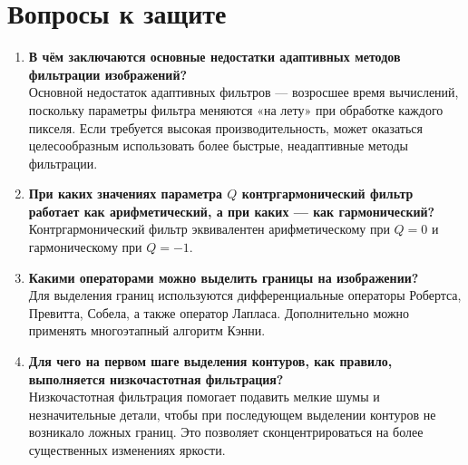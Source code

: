 \documentclass[a4paper,12pt]{article}
\begin{document}
\section{Вопросы к защите}
\begin{enumerate}
    \item \textbf{В чём заключаются основные недостатки адаптивных методов фильтрации изображений?}\\[0.3em]
    Основной недостаток адаптивных фильтров --- возросшее время вычислений, поскольку параметры фильтра меняются «на лету» при обработке каждого пикселя. Если требуется высокая производительность, может оказаться целесообразным использовать более быстрые, неадаптивные методы фильтрации.

    \item \textbf{При каких значениях параметра \(Q\) контргармонический фильтр работает как арифметический, а при каких --- как гармонический?}\\[0.3em]
    Контргармонический фильтр эквивалентен арифметическому при \(Q = 0\) и гармоническому при \(Q = -1\).

    \item \textbf{Какими операторами можно выделить границы на изображении?}\\[0.3em]
    Для выделения границ используются дифференциальные операторы Робертса, Превитта, Собела, а также оператор Лапласа. Дополнительно можно применять многоэтапный алгоритм Кэнни.

    \item \textbf{Для чего на первом шаге выделения контуров, как правило, выполняется низкочастотная фильтрация?}\\[0.3em]
    Низкочастотная фильтрация помогает подавить мелкие шумы и незначительные детали, чтобы при последующем выделении контуров не возникало ложных границ. Это позволяет сконцентрироваться на более существенных изменениях яркости.
\end{enumerate}
\end{document}
